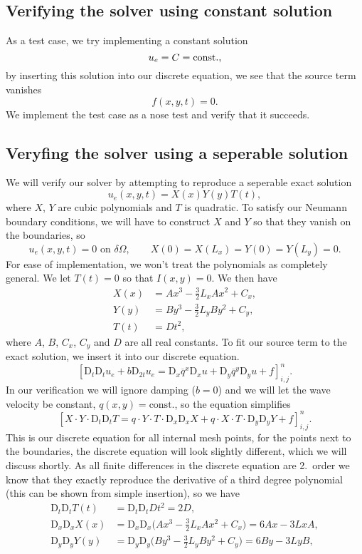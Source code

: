 \documentclass[a4paper, 11pt, notitlepage, english]{article}
\newcommand{\D}{\mbox{D}}
\begin{document}
\subsection*{Verifying the solver using constant solution}
As a test case, we try implementing a constant solution
$$u_e = C = {\rm const.},$$
by inserting this solution into our discrete equation, we see that the source term vanishes
$$f(x,y,t) = 0.$$
We implement the test case as a nose test and verify that it succeeds.

\subsection*{Veryfing the solver using a seperable solution}
We will verify our solver by attempting to reproduce a seperable exact solution
$$u_e(x,y,t) = X(x)Y(y)T(t),$$
where $X$, $Y$ are cubic polynomials and $T$ is quadratic. To satisfy our Neumann boundary conditions, we will have to construct $X$ and $Y$ so that they vanish on the boundaries, so
$$u_e(x,y,t) = 0 \mbox{ on } \delta\Omega, \qquad X(0)=X(L_x)=Y(0)=Y(L_y)=0.$$
For ease of implementation, we won't treat the polynomials as completely general. We let $T(t)=0$ so that $I(x,y)=0$. We then have
\begin{align*}
X(x) &= A x^3 -\frac{3}{2}L_xAx^2 + C_x, \\
Y(y) &= B y^3 -\frac{3}{2}L_yBy^2 + C_y, \\
T(t) &= D t^2,
\end{align*}
where $A$, $B$, $C_x$, $C_y$ and $D$ are all real constants. To fit our source term to the exact solution, we insert it into our discrete equation.
$$[\D_t\D_t u_e + b\D_{2t}u_e = \D_x \overline{q}^{x}\D_x u + \D_y \overline{q}^y \D_y u + f]^{n}_{i,j}.$$
In our verification we will ignore damping ($b=0$) and we will let the wave velocity be constant, $q(x,y)=\mbox{const.}$, so the equation simplifies 
$$[X\cdot Y\cdot \D_t\D_t T = q\cdot  Y\cdot T\cdot  \D_x \D_x X + q\cdot  X\cdot T\cdot  \D_y \D_y Y + f]^{n}_{i,j}.$$
This is our discrete equation for all internal mesh points, for the points next to the boundaries, the discrete equation will look slightly different, which we will discuss shortly. As all finite differences in the discrete equation are 2.\ order we know that they exactly reproduce the derivative of a third degree polynomial (this can be shown from simple insertion), so we have
\begin{align*}
\D_t \D_t T(t) &= \D_t \D_t Dt^2 = 2D, \\
\D_x \D_x X(x) &= \D_x \D_x \bigg(A x^3 -\frac{3}{2}L_xAx^2 + C_x\bigg) = 6Ax - 3LxA, \\  
\D_y \D_y Y(y) &= \D_y \D_y \bigg(B y^3 -\frac{3}{2}L_yBy^2 + C_y\bigg) = 6By - 3LyB, \\  
\end{align*}
\end{document}
